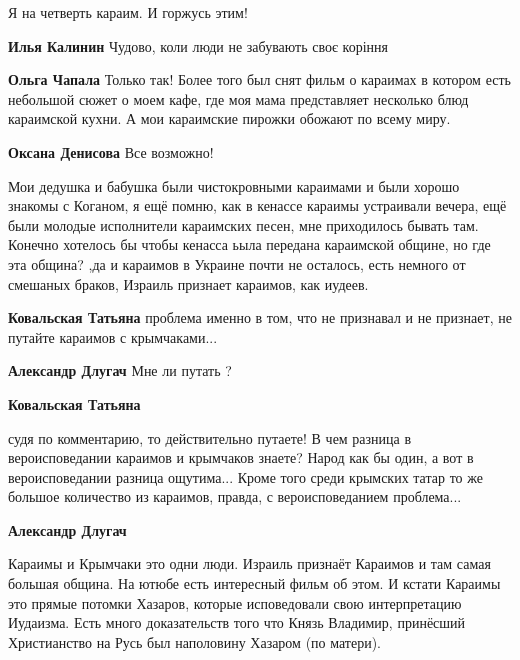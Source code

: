 \begin{itemize}
\begin{itemize}
Я на четверть караим. И горжусь этим!

\begin{itemize} %
\textbf{Илья Калинин} Чудово, коли люди не забувають своє коріння

\textbf{Ольга Чапала} Только так! Более того был снят фильм о караимах в котором есть небольшой сюжет о моем кафе, где моя мама представляет несколько блюд караимской кухни. А мои караимские пирожки обожают по всему миру.
\end{itemize} %

\textbf{Оксана Денисова} Все возможно!

\end{itemize} %


Мои дедушка и бабушка были чистокровными караимами и были хорошо знакомы с
Коганом, я ещё помню, как в кенассе караимы устраивали вечера, ещё были молодые
исполнители караимских песен, мне приходилось бывать там. Конечно хотелось бы
чтобы кенасса ьыла передана караимской общине, но где эта община? ,да и
караимов в Украине почти не осталось, есть немного от смешаных браков, Израиль
признает караимов, как иудеев.

\begin{itemize} %
\textbf{Ковальская Татьяна} проблема именно в том, что не признавал и не признает, не путайте караимов с крымчаками...

\begin{itemize} %
\textbf{Александр Длугач} Мне ли путать ?

\textbf{Ковальская Татьяна} 

судя по комментарию, то действительно путаете! В чем разница в вероисповедании
караимов и крымчаков знаете? Народ как бы один, а вот в вероисповедании разница
ощутима... Кроме того среди крымских татар то же большое количество из
караимов, правда, с вероисповеданием проблема...

\textbf{Александр Длугач} 

Караимы и Крымчаки это одни люди. Израиль признаёт Караимов и там самая большая
община. На ютюбе есть интересный фильм об этом. И кстати Караимы это прямые
потомки Хазаров, которые исповедовали свою интерпретацию Иудаизма. Есть много
доказательств того что Князь Владимир, принёсший Христианство на Русь был
наполовину Хазаром (по матери).


\end{itemize}
\end{itemize}
\end{itemize}
